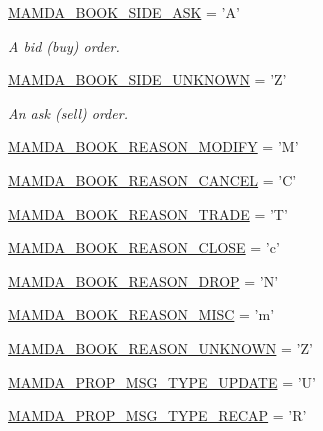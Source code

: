 \begin{CompactItemize}
\hyperlink{classWombat_1_1MamdaOrderBookTypes_87019addc1047d47d704b1551013934341720355a266d11f5c17a44e90883e68}{MAMDA\_\-BOOK\_\-SIDE\_\-ASK} = 'A'
\begin{CompactList}\small\item\em A bid (buy) order. \item\end{CompactList}\item 
\hyperlink{classWombat_1_1MamdaOrderBookTypes_87019addc1047d47d704b15510139343ccb0ae3d2e7174ab40f253fa7a3c9896}{MAMDA\_\-BOOK\_\-SIDE\_\-UNKNOWN} = 'Z'
\begin{CompactList}\small\item\em An ask (sell) order. \item\end{CompactList}\item 
\hyperlink{classWombat_1_1MamdaOrderBookTypes_a1147c14315f68b9371c92a6a259fbd58c66d9f8efe5d084165af5826a27f984}{MAMDA\_\-BOOK\_\-REASON\_\-MODIFY} = 'M'
\item 
\hyperlink{classWombat_1_1MamdaOrderBookTypes_a1147c14315f68b9371c92a6a259fbd576efc0c5dd58e7ab7fef01730ff3b6eb}{MAMDA\_\-BOOK\_\-REASON\_\-CANCEL} = 'C'
\item 
\hyperlink{classWombat_1_1MamdaOrderBookTypes_a1147c14315f68b9371c92a6a259fbd56237b4212d23a32dbfa1b9c7b8653922}{MAMDA\_\-BOOK\_\-REASON\_\-TRADE} = 'T'
\item 
\hyperlink{classWombat_1_1MamdaOrderBookTypes_a1147c14315f68b9371c92a6a259fbd578d9edd5a28a475e2fc14646f942e952}{MAMDA\_\-BOOK\_\-REASON\_\-CLOSE} = 'c'
\item 
\hyperlink{classWombat_1_1MamdaOrderBookTypes_a1147c14315f68b9371c92a6a259fbd5fca7fc200b4c5d50bb891b6e75fd4a7d}{MAMDA\_\-BOOK\_\-REASON\_\-DROP} = 'N'
\item 
\hyperlink{classWombat_1_1MamdaOrderBookTypes_a1147c14315f68b9371c92a6a259fbd5912709034d0ce5e6f91da2544d775be6}{MAMDA\_\-BOOK\_\-REASON\_\-MISC} = 'm'
\item 
\hyperlink{classWombat_1_1MamdaOrderBookTypes_a1147c14315f68b9371c92a6a259fbd514c83d7de2b7b3b34b8dbb71a62dc4d0}{MAMDA\_\-BOOK\_\-REASON\_\-UNKNOWN} = 'Z'
\item 
\hyperlink{classWombat_1_1MamdaOrderBookTypes_26ecc0a14e1e6bce991aff91b987c5e42dd181d5edf1af964fdbb8bfb67a14b4}{MAMDA\_\-PROP\_\-MSG\_\-TYPE\_\-UPDATE} = 'U'
\item 
\hyperlink{classWombat_1_1MamdaOrderBookTypes_26ecc0a14e1e6bce991aff91b987c5e4b659285b56938f7f69a4855712b172ae}{MAMDA\_\-PROP\_\-MSG\_\-TYPE\_\-RECAP} = 'R'

\end{CompactItemize}
